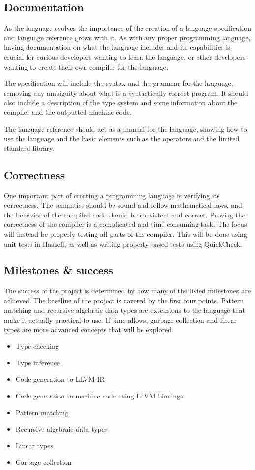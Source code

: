 \documentclass[12pt,a4paper]{article}
\begin{document}
\subsection{Documentation}
As the language evolves the importance of the creation of a language specification and 
language reference grows with it.
As with any proper programming language, having documentation on what the language includes 
and its capabilities
is crucial for curious developers wanting to learn the language, or other developers wanting 
to create their own compiler for the language.

The specification will include the syntax and the grammar for the language, removing any 
ambiguity about what
is a syntactically correct program. It should also include a description of the type system 
and some information
about the compiler and the outputted machine code.

The language reference should act as a manual for the language, showing how to use the 
language and the basic elements such as the operators and the limited standard library.

\subsection{Correctness}
One important part of creating a programming language is verifying its correctness.
The semantics should be sound and follow mathematical laws, and the behavior of the compiled 
code should be consistent and correct.
Proving the correctness of the compiler is a complicated and time-consuming task. The focus 
will instead be properly testing all parts of the compiler. This will be done using unit 
tests in Haskell, as well as writing property-based tests using QuickCheck. \cite{claessen2000quickcheck}

\subsection{Milestones \& success}
The success of the project is determined by how many of the listed milestones are achieved. The baseline of the project is
covered by the first four points. Pattern matching and recursive algebraic data types are extensions to the language that
make it actually practical to use. If time allows, garbage collection and linear types are more advanced concepts that
will be explored.

\begin{itemize}
\item Type checking
\item Type inference
\item Code generation to LLVM IR
\item Code generation to machine code using LLVM bindings
\item Pattern matching
\item Recursive algebraic data types
\item Linear types
\item Garbage collection
\end{itemize}
\end{document}
